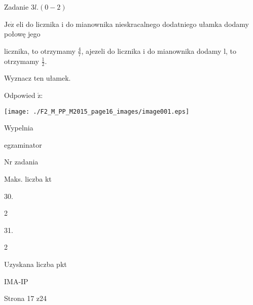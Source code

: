 \documentclass[a4paper,12pt]{article}
\begin{document}
Zadanie $3l. (0-2)$

$\mathrm{J}\mathrm{e}\dot{\mathrm{z}}$ eli do licznika i do mianownika nieskracalnego dodatniego ułamka dodamy połowę jego

licznika, to otrzymamy $\displaystyle \frac{4}{7}$, ajezeli do licznika i do mianownika dodamy l, to otrzymamy $\displaystyle \frac{1}{2}.$

Wyznacz ten ułamek.

Odpowied $\acute{\mathrm{z}}$:
\begin{center}
\texttt{[image: ./F2\_M\_PP\_M2015\_page16\_images/image001.eps]}
\end{center}
Wypelnia

egzaminator

Nr zadania

Maks. liczba kt

30.

2

31.

2

Uzyskana liczba pkt

IMA-IP

Strona 17 z24
\end{document}
